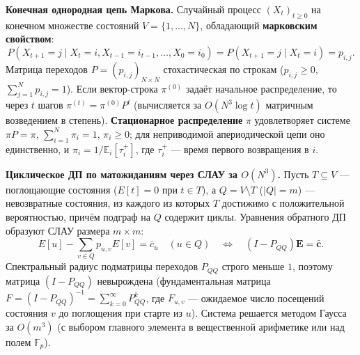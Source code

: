 \documentclass[10pt,a4paper]{article}
\renewcommand{\ge}{\geqslant}
\newcommand{\F}{\mathbb{F}}
\newcommand{\E}{\mathbb{E}}
\begin{document}
\textbf{Конечная однородная цепь Маркова.} Случайный процесс $(X_t)_{t \ge 0}$ на конечном множестве состояний $V = \{1, \dots, N\}$, обладающий \textbf{марковским свойством}:
\[
  P(X_{t + 1} = j \mid X_t = i, X_{t - 1} = i_{t - 1}, \dots, X_0 = i_0) = P(X_{t + 1} = j \mid X_t = i) = p_{i,j}.
\]
Матрица переходов $P = (p_{i,j})_{N \times N}$ стохастическая по строкам ($p_{i,j} \ge 0$, $\sum_{j=1}^N p_{i,j} = 1$). Если вектор-строка $\pi^{(0)}$ задаёт начальное распределение, то через $t$ шагов $\pi^{(t)} = \pi^{(0)} P^t$ (вычисляется за $O(N^3 \log t)$ матричным возведением в степень). \textbf{Стационарное распределение} $\pi$ удовлетворяет системе $\pi P = \pi$, $\sum_{i=1}^N \pi_i = 1$, $\pi_i \ge 0$; для неприводимой апериодической цепи оно единственно, и $\pi_i = 1 / \E_i[\tau_i^+]$, где $\tau_i^+$ — время первого возвращения в $i$.

\textbf{Циклическое ДП по матожиданиям через СЛАУ за $O(N^3)$.} Пусть $T \subseteq V$ — поглощающие состояния ($E[t] = 0$ при $t \in T$), а $Q = V \setminus T$ ($|Q| = m$) — невозвратные состояния, из каждого из которых $T$ достижимо с положительной вероятностью, причём подграф на $Q$ содержит циклы. Уравнения обратного ДП образуют СЛАУ размера $m \times m$:
\[
  E[u] - \sum_{v \in Q} p_{u,v} E[v] = \bar{c}_u \quad (u \in Q) \quad \Longleftrightarrow \quad (I - P_{QQ}) \mathbf{E} = \bar{\mathbf{c}}.
\]
Спектральный радиус подматрицы переходов $P_{QQ}$ строго меньше $1$, поэтому матрица $(I - P_{QQ})$ невырождена (фундаментальная матрица $F = (I - P_{QQ})^{-1} = \sum_{k=0}^\infty P_{QQ}^k$, где $F_{u,v}$ — ожидаемое число посещений состояния $v$ до поглощения при старте из $u$). Система решается методом Гаусса за $O(m^3)$ (с выбором главного элемента в вещественной арифметике или над полем $\F_p$).
\end{document}
